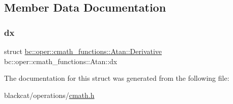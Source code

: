 \subsection{Member Data Documentation}
\mbox{\label{structbc_1_1oper_1_1cmath__functions_1_1Atan_a6298e19488a3e83b2012798de1f8406a}} 
\subsubsection{\texorpdfstring{dx}{dx}}
{\footnotesize\ttfamily struct \hyperlink{structbc_1_1oper_1_1cmath__functions_1_1Atan_1_1Derivative}{bc\+::oper\+::cmath\+\_\+functions\+::\+Atan\+::\+Derivative}   bc\+::oper\+::cmath\+\_\+functions\+::\+Atan\+::dx}



The documentation for this struct was generated from the following file\+:\begin{DoxyCompactItemize}
\item 
blackcat/operations/\hyperlink{cmath_8h}{cmath.\+h}\end{DoxyCompactItemize}
